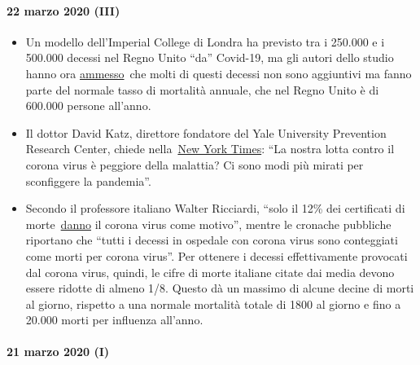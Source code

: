 \hypertarget{22-marzo-2020-iii}{%
\paragraph{22 marzo 2020 (III)}\label{22-marzo-2020-iii}}

\begin{itemize}
\tightlist
\item
  Un modello dell'Imperial College di Londra ha previsto tra i 250.000 e
  i 500.000 decessi nel Regno Unito ``da'' Covid-19, ma gli autori dello
  studio hanno ora
  \href{https://www.bbc.com/news/health-51979654}{ammesso}~che molti di
  questi decessi non sono aggiuntivi ma fanno parte del normale tasso di
  mortalità annuale, che nel Regno Unito è di 600.000 persone all'anno.
\item
  Il dottor David Katz, direttore fondatore del Yale University
  Prevention Research Center, chiede
  nella~\href{https://www.nytimes.com/2020/03/20/opinion/coronavirus-pandemic-social-distancing.html}{New
  York Times}: ``La nostra lotta contro il corona virus è peggiore della
  malattia? Ci sono modi più mirati per sconfiggere la pandemia''.
\item
  Secondo il professore italiano Walter Ricciardi, ``solo il 12\% dei
  certificati di
  morte~\href{https://web.archive.org/web/20200324214448/https://www.telegraph.co.uk/global-health/science-and-disease/have-many-coronavirus-patients-died-italy/}{danno}
  il corona virus come motivo'', mentre le cronache pubbliche riportano
  che ``tutti i decessi in ospedale con corona virus sono conteggiati
  come morti per corona virus''. Per ottenere i decessi effettivamente
  provocati dal corona virus, quindi, le cifre di morte italiane citate
  dai media devono essere ridotte di almeno 1/8. Questo dà un massimo di
  alcune decine di morti al giorno, rispetto a una normale mortalità
  totale di 1800 al giorno e fino a 20.000 morti per influenza all'anno.
\end{itemize}

\hypertarget{21-marzo-2020-i}{%
\paragraph{21 marzo 2020 (I)}\label{21-marzo-2020-i}}

